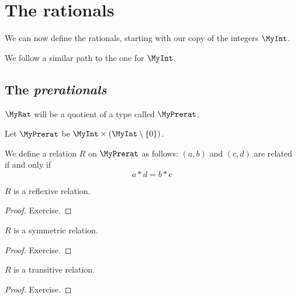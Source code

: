 \chapter{The rationals}

We can now define the rationals, starting with our copy of the integers $\MyInt$.

We follow a similar path to the one for $\MyInt$.

\section{The \emph{prerationals}}

$\MyRat$ will be a quotient of a type called $\MyPrerat$.

\begin{definition}
    \label{MyPrerat}
    \leanok
    Let $\MyPrerat$ be $\MyInt \times (\MyInt \setminus \{0\})$.
\end{definition}

\begin{definition}
    \label{MyPrerat.R}
    \leanok
We define a relation $R$ on $\MyPrerat$ as follows: $(a,b)$ and $(c, d)$ are related if and only if
\[
a * d = b * c
\]
\end{definition}

\begin{lemma}
$R$ is a reflexive relation.
    \label{MyPrerat.R_refl}
    \leanok
\end{lemma}
\begin{proof}
    \leanok
    Exercise.
\end{proof}

\begin{lemma}
$R$ is a symmetric relation.
    \label{MyPrerat.R_symm}
    \leanok
\end{lemma}
\begin{proof}
    \leanok
    Exercise.
\end{proof}

\begin{lemma}
$R$ is a transitive relation.
    \label{MyPrerat.R_trans}
    \leanok
\end{lemma}
\begin{proof}
    \leanok
    Exercise.
\end{proof}

